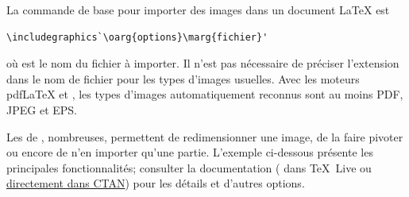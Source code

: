La commande de base pour importer des images dans un document {\LaTeX} est
\begin{lstlisting}
\includegraphics`\oarg{options}\marg{fichier}'
\end{lstlisting}
où  est le nom du fichier à importer. Il n'est pas
nécessaire de préciser l'extension dans le nom de fichier pour les
types d'images usuelles. Avec les moteurs pdf{\LaTeX} et {\XeLaTeX},
les types d'images automatiquement reconnus sont au moins PDF, JPEG et
EPS.

Les  de , nombreuses, permettent
de redimensionner une image, de la faire pivoter ou encore de n'en
importer qu'une partie. L'exemple ci-dessous présente les principales
fonctionnalités; consulter la documentation %
( dans {\TeX}~Live ou
  \href{http://mirrors.ctan.org/macros/latex/required/graphics/grfguide.pdf}{%
    directement dans CTAN}) %
pour les détails et d'autres options.

